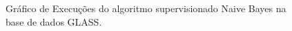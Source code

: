 \begin{figure}[!h]
{        \label{fig:graf:GLASS_NB_3} }
    \hspace{0.5cm}
    \caption{Gráfico de Execuções do algoritmo supervisionado Naive Bayes na base de dados GLASS.} \label{fig:graf:NB}
        
\end{figure}

